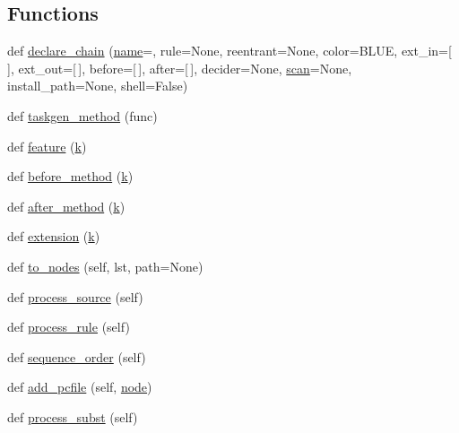 \subsection*{Functions}
\begin{DoxyCompactItemize}
\item 
def \hyperlink{namespacewaflib_1_1_task_gen_ab1b4a3c17ac379029f92010b42c61562}{declare\+\_\+chain} (\hyperlink{lib_2expat_8h_a1b49b495b59f9e73205b69ad1a2965b0}{name}=\textquotesingle{}\textquotesingle{}, rule=None, reentrant=None, color=\textquotesingle{}B\+L\+UE\textquotesingle{}, ext\+\_\+in=\mbox{[}$\,$\mbox{]}, ext\+\_\+out=\mbox{[}$\,$\mbox{]}, before=\mbox{[}$\,$\mbox{]}, after=\mbox{[}$\,$\mbox{]}, decider=None, \hyperlink{namespacewaflib_1_1_task_gen_ab2e9d641671fe6c1322b12582dc6fbae}{scan}=None, install\+\_\+path=None, shell=False)
\item 
def \hyperlink{namespacewaflib_1_1_task_gen_a7dbef0932ffa38ee03c2207d272d7974}{taskgen\+\_\+method} (func)
\item 
def \hyperlink{namespacewaflib_1_1_task_gen_a839f18f16539f3131cbe573262099bf1}{feature} (\hyperlink{rfft2d_test_m_l_8m_adc468c70fb574ebd07287b38d0d0676d}{k})
\item 
def \hyperlink{namespacewaflib_1_1_task_gen_a56d188988dd3babc77f1d283e1f8c1b1}{before\+\_\+method} (\hyperlink{rfft2d_test_m_l_8m_adc468c70fb574ebd07287b38d0d0676d}{k})
\item 
def \hyperlink{namespacewaflib_1_1_task_gen_a3411cecc8687a44154a45078c3224fb7}{after\+\_\+method} (\hyperlink{rfft2d_test_m_l_8m_adc468c70fb574ebd07287b38d0d0676d}{k})
\item 
def \hyperlink{namespacewaflib_1_1_task_gen_ab4b159e661d17937cf1be8254dedb12f}{extension} (\hyperlink{rfft2d_test_m_l_8m_adc468c70fb574ebd07287b38d0d0676d}{k})
\item 
def \hyperlink{namespacewaflib_1_1_task_gen_ad97b4407f70d2669e7d7432492f8cf04}{to\+\_\+nodes} (self, lst, path=None)
\item 
def \hyperlink{namespacewaflib_1_1_task_gen_ab61ec340af31e192a487638f29749fd2}{process\+\_\+source} (self)
\item 
def \hyperlink{namespacewaflib_1_1_task_gen_a769b126d25e4d7ef43241519266dc8c6}{process\+\_\+rule} (self)
\item 
def \hyperlink{namespacewaflib_1_1_task_gen_a5d205491eb15ecf670e07910b401a65e}{sequence\+\_\+order} (self)
\item 
def \hyperlink{namespacewaflib_1_1_task_gen_a958d404a5d65eab9676a19d7c6ee53b6}{add\+\_\+pcfile} (self, \hyperlink{structnode}{node})
\item 
def \hyperlink{namespacewaflib_1_1_task_gen_a7c83d141b0d2a372d24274a0070d9162}{process\+\_\+subst} (self)
\end{DoxyCompactItemize}
